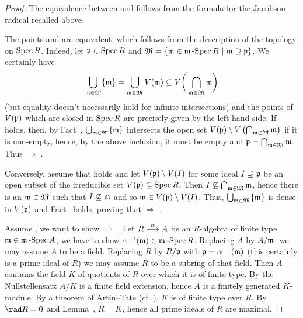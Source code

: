 \documentclass[a4paper,parskip=half,numbers=enddot, DIV=12]{scrreprt}
\begin{document}
\begin{proof}
    The equivalence between  and  follows from the formula for the Jacobson radical recalled above.
    
    The points  and  are equivalent, which follows from the description of the topology on $\operatorname{Spec} R$. Indeed, let $\mathfrak{p}\in\operatorname{Spec} R$ and $\mathfrak{M}=\left\{\mathfrak{m}\in\mathfrak{m}\operatorname{-Spec} R\ \middle|\  \mathfrak{m}\supseteq\mathfrak{p}\right\}$. We certainly have 
    \begin{align*}
    	\bigcup_{\mathfrak{m}\in\mathfrak{M}}\{\mathfrak{m}\}=\bigcup_{\mathfrak{m}\in\mathfrak{M}}V(\mathfrak{m})\subseteq V\bigg(\bigcap_{\mathfrak{m}\in\mathfrak{M}}\mathfrak{m}\bigg)
    \end{align*}
     (but equality doesn't necessarily hold for infinite intersections) and the points of $V(\mathfrak{p})$ which are closed in $\operatorname{Spec} R$ are precisely given by the left-hand side. If  holds, then, by Fact~, $\bigcup_{\mathfrak{m}\in\mathfrak{M}}\{\mathfrak{m}\}$ intersects the open set $V(\mathfrak{p})\setminus V\left(\bigcap_{\mathfrak{m}\in\mathfrak{M}}\mathfrak{m}\right)$ if it is non-empty, hence, by the above inclusion, it must be empty and $\mathfrak{p}=\bigcap_{\mathfrak{m}\in\mathfrak{M}}\mathfrak{m}$. Thus  $\Rightarrow$ .
     
     Conversely, assume that  holds and let $V(\mathfrak{p})\setminus V(I)$ for some ideal $I\supsetneq\mathfrak{p}$ be an open subset of the irreducible set $V(\mathfrak{p})\subseteq \operatorname{Spec} R$. Then $I\not\subseteq \bigcap_{\mathfrak{m}\in\mathfrak{M}}\mathfrak{m}$, hence there is an $\mathfrak{m}\in\mathfrak{M}$ such that $I\not\subseteq\mathfrak{m}$ and so $\mathfrak{m}\in V(\mathfrak{p})\setminus V(I)$. Thus, $\bigcup_{\mathfrak{m}\in\mathfrak{M}}\{\mathfrak{m}\}$ is dense in $V(\mathfrak{p})$ and Fact~ holds, proving that  $\Rightarrow$ .
    
    Assume , we want to show  $\Rightarrow$ . Let $R\morphism[\alpha]A$ be an $R$-algebra of finite type, $\mathfrak{m}\in \mathfrak{m}\operatorname{-Spec} A$, we have to show $\alpha^{-1}(\mathfrak{m}) \in \mathfrak{m}\operatorname{-Spec} R$. Replacing $A$ by $A/\mathfrak{m}$, we may assume $A$ to be a field. Replacing $R$ by $R/\mathfrak{p}$ with $\mathfrak{p} = \alpha^{-1}(\mathfrak{m})$ (this certainly is a prime ideal of $R$) we may assume $R$ to be a subring of that field. Then $A$ contains the field $K$ of quotients of $R$ over which it is of finite type. By the Nullstellensatz $A/K$ is a finite field extension, hence $A$ is a finitely generated $K$-module. By a theorem of Artin--Tate (cf. \cite[Proposition~1.4.2]{alg1}), $K$ is of finite type over $R$. By $\rad R = 0$ and Lemma~, $R=K$, hence all prime ideals of $R$ are maximal. 
    

\end{proof}
\end{document}
